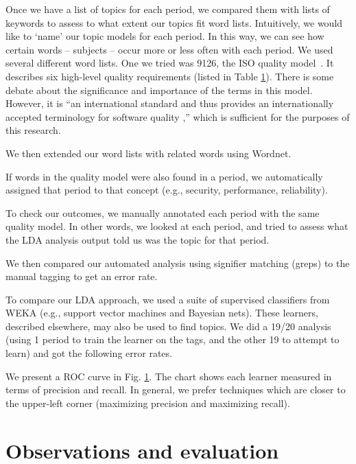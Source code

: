 \documentclass[10pt, conference, compsocconf]{IEEEtran}
\begin{document}
	Once we have a list of topics for each period, we compared them with lists of keywords to assess to what extent our topics fit word lists. Intuitively, we would like to `name' our topic models for each period. In this way, we can see how certain words -- subjects -- occur more or less often with each period. We used several different word lists. One we tried was 9126, the ISO quality model~\cite{iso9126}. It describes six high-level quality requirements (listed in Table \ref{}). There is some debate about the significance and importance of the terms in this model. However, it is ``an international standard and thus provides an internationally accepted terminology for software quality \cite[p. 58]{Bøegh2008},'' which is sufficient for the purposes of this research. %

	We then extended our word lists with related words using Wordnet.
	
	 If words in the quality model were also found in a period, we automatically assigned that period to that concept (e.g., security, performance, reliability). 

To check our outcomes, we manually annotated each period with the same quality model. In other words, we looked at each period, and tried to assess what the LDA analysis output told us was the topic for that period.

We then compared our automated analysis using signifier matching (greps) to the manual tagging to get an error rate.

To compare our LDA approach, we used a suite of supervised classifiers from WEKA (e.g., support vector machines and Bayesian nets). These learners, described elsewhere, may also be used to find topics. We did a 19/20 analysis (using 1 period to train the learner on the tags, and the other 19 to attempt to learn) and got the following error rates. 

We present a ROC curve in Fig. \ref{}. The chart shows each learner measured in terms of precision and recall. In general, we prefer techniques which are closer to the upper-left corner (maximizing precision and maximizing recall). 



\section{Observations and evaluation}
\end{document}
